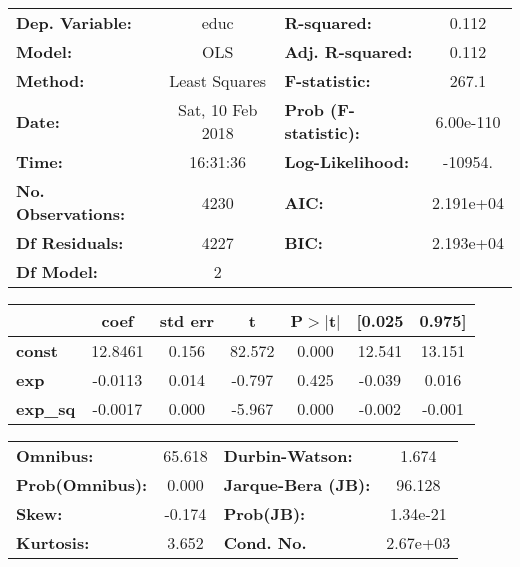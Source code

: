 \begin{center}
\begin{tabular}{lclc}
\toprule
\textbf{Dep. Variable:}    &       educ       & \textbf{  R-squared:         } &     0.112   \\
\textbf{Model:}            &       OLS        & \textbf{  Adj. R-squared:    } &     0.112   \\
\textbf{Method:}           &  Least Squares   & \textbf{  F-statistic:       } &     267.1   \\
\textbf{Date:}             & Sat, 10 Feb 2018 & \textbf{  Prob (F-statistic):} & 6.00e-110   \\
\textbf{Time:}             &     16:31:36     & \textbf{  Log-Likelihood:    } &   -10954.   \\
\textbf{No. Observations:} &        4230      & \textbf{  AIC:               } & 2.191e+04   \\
\textbf{Df Residuals:}     &        4227      & \textbf{  BIC:               } & 2.193e+04   \\
\textbf{Df Model:}         &           2      & \textbf{                     } &             \\
\bottomrule
\end{tabular}
\begin{tabular}{lcccccc}
                 & \textbf{coef} & \textbf{std err} & \textbf{t} & \textbf{P$>$$|$t$|$} & \textbf{[0.025} & \textbf{0.975]}  \\
\midrule
\textbf{const}   &      12.8461  &        0.156     &    82.572  &         0.000        &       12.541    &       13.151     \\
\textbf{exp}     &      -0.0113  &        0.014     &    -0.797  &         0.425        &       -0.039    &        0.016     \\
\textbf{exp\_sq} &      -0.0017  &        0.000     &    -5.967  &         0.000        &       -0.002    &       -0.001     \\
\bottomrule
\end{tabular}
\begin{tabular}{lclc}
\textbf{Omnibus:}       & 65.618 & \textbf{  Durbin-Watson:     } &    1.674  \\
\textbf{Prob(Omnibus):} &  0.000 & \textbf{  Jarque-Bera (JB):  } &   96.128  \\
\textbf{Skew:}          & -0.174 & \textbf{  Prob(JB):          } & 1.34e-21  \\
\textbf{Kurtosis:}      &  3.652 & \textbf{  Cond. No.          } & 2.67e+03  \\
\bottomrule
\end{tabular}
\end{center}
